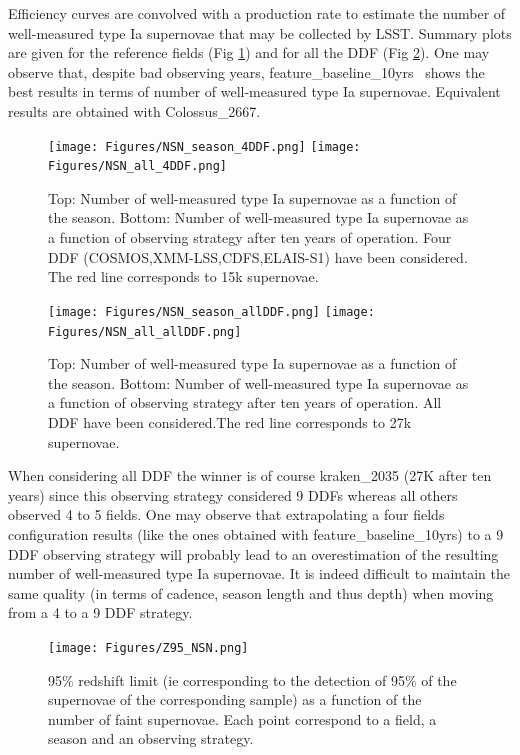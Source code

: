 \documentclass [11pt,a4paper]{article}
\newcommand{\cosmos}{COSMOS}
\newcommand{\xmmlss}{XMM-LSS}
\newcommand{\cdfs}{CDFS}
\newcommand{\elais}{ELAIS-S1}
\newcommand{\feature}{feature\_baseline\_10yrs}
\begin{document}
Efficiency curves are convolved with a production rate \cite{perrett} to estimate the number of well-measured type Ia supernovae that may be collected by LSST. Summary plots are given for the reference fields (Fig \ref{fig:nsn_four}) and for all the DDF (Fig \ref{fig:nsn_all}). One may observe that, despite bad observing years, \feature~ shows the best results in terms of number of well-measured type Ia supernovae. Equivalent results are obtained with Colossus\_2667.

\begin{figure}[htbp]
\begin{center}
  
  \texttt{[image: Figures/NSN\_season\_4DDF.png]}
  \texttt{[image: Figures/NSN\_all\_4DDF.png]}
 \caption{Top: Number of well-measured type Ia supernovae as a function of the season. Bottom: Number of  well-measured type Ia supernovae as a function of observing strategy after ten years of operation. Four DDF (\cosmos,\xmmlss,\cdfs,\elais) have been considered. The red line corresponds to 15k supernovae.}\label{fig:nsn_four}
\end{center}
\end{figure}

\begin{figure}[htbp]
\begin{center}
  
  \texttt{[image: Figures/NSN\_season\_allDDF.png]}
  \texttt{[image: Figures/NSN\_all\_allDDF.png]}
 \caption{Top: Number of well-measured type Ia supernovae as a function of the season. Bottom: Number of  well-measured type Ia supernovae as a function of observing strategy after ten years of operation. All DDF have been considered.The red line corresponds to 27k supernovae.}\label{fig:nsn_all}
\end{center}
\end{figure}

When considering all DDF the winner is of course kraken\_2035 (27K after ten years) since this observing strategy considered 9 DDFs whereas all others observed 4 to 5 fields. One may observe that extrapolating a four fields configuration results (like the ones obtained with \feature) to a 9 DDF observing strategy will probably lead to an overestimation of the resulting number of well-measured type Ia supernovae. It is indeed difficult to maintain the same quality (in terms of cadence, season length and thus depth) when moving from a 4 to a 9 DDF strategy.

\begin{figure}[htbp]
\begin{center}
  
  \texttt{[image: Figures/Z95\_NSN.png]}
 \caption{95\% redshift limit (ie corresponding to the detection of 95\% of the supernovae of the corresponding sample) as a function of the number of faint supernovae. Each point correspond to a field, a season and an observing strategy.}\label{fig:z95}
\end{center}
\end{figure}
\end{document}
